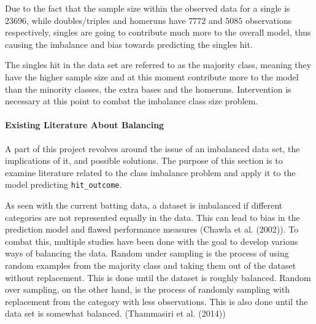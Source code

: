 \documentclass[
  letterpaper,
  DIV=11,
  numbers=noendperiod]{scrartcl}
\let\oldparagraph\paragraph
\renewcommand{\paragraph}[1]{\oldparagraph{#1}\mbox{}}
\begin{document}
Due to the fact that the sample size within the observed data for a
single is \(23696\), while doubles/triples and homeruns have \(7772\)
and \(5085\) observations respectively, singles are going to contribute
much more to the overall model, thus causing the imbalance and bias
towards predicting the singles hit.

The singles hit in the data set are referred to as the majority class,
meaning they have the higher sample size and at this moment contribute
more to the model than the minority classes, the extra bases and the
homeruns. Intervention is necessary at this point to combat the
imbalance class size problem.

\paragraph{Existing Literature About
Balancing}\label{existing-literature-about-balancing}

A part of this project revolves around the issue of an imbalanced data
set, the implications of it, and possible solutions. The purpose of this
section is to examine literature related to the class imbalance problem
and apply it to the model predicting \texttt{hit\_outcome}.

As seen with the current batting data, a dataset is imbalanced if
different categories are not represented equally in the data. This can
lead to bias in the prediction model and flawed performance measures
(Chawla et al. (2002)). To combat this, multiple studies have been done
with the goal to develop various ways of balancing the data. Random
under sampling is the process of using random examples from the majority
class and taking them out of the dataset without replacement. This is
done until the dataset is roughly balanced. Random over sampling, on the
other hand, is the process of randomly sampling with replacement from
the category with less observations. This is also done until the data
set is somewhat balanced. (Thammasiri et al. (2014))
\end{document}

